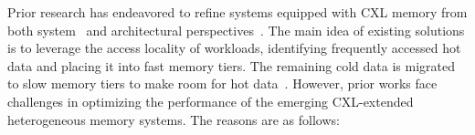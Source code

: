 

Prior research has endeavored to refine systems equipped with CXL memory from both system~\cite{tpp_asplos23, memtis_sosp23} and architectural perspectives~\cite{neomem, memstrata_osdi24}. The main idea of existing solutions is to leverage the access locality of workloads, identifying frequently accessed hot data and placing it into fast memory tiers. The remaining cold data is migrated to slow memory tiers to make room for hot data~\cite{mtm_ren2023, vtmm_eurosys23, simple_sc10}. 
However, prior works face challenges in optimizing the performance of the emerging CXL-extended heterogeneous memory systems. The reasons are as follows:

